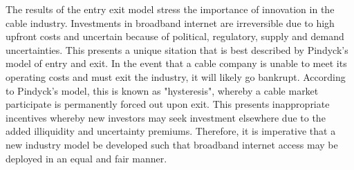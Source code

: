 \documentclass[a4paper,oneside]{article}
\begin{document}
The results of the entry exit model stress the importance of innovation in the cable industry. 
Investments in broadband internet are irreversible due to high upfront costs and uncertain because of political, regulatory, supply and demand uncertainties.
This presents a unique sitation that is best described by Pindyck's model of entry and exit.
In the event that a cable company is unable to meet its operating costs and must exit the industry, it will likely go bankrupt.
According to Pindyck's model, this is known as "hysteresis", whereby a cable market participate is permanently forced out upon exit.
This presents inappropriate incentives whereby new investors may seek investment elsewhere due to the added illiquidity and uncertainty premiums.
Therefore, it is imperative that a new industry model be developed such that broadband internet access may be deployed in an equal and fair manner.
\end{document}
